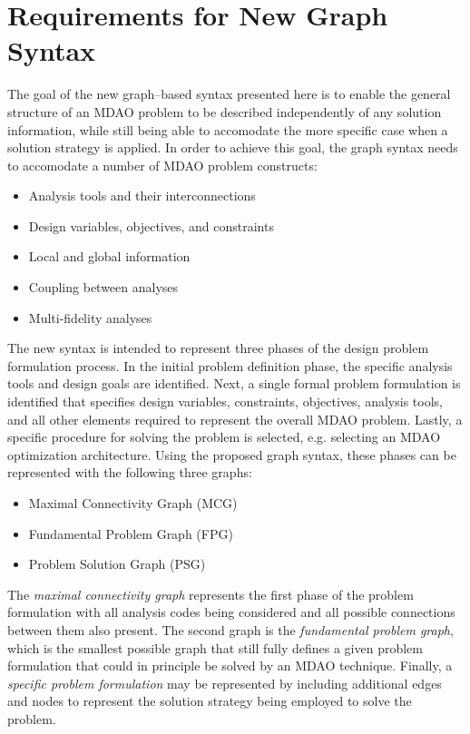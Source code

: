 \newcommand{\st}{ \ | \ }

\section{Requirements for New Graph Syntax}
  \label{s:requirements}
  The goal of the new graph--based syntax presented here is to enable the general structure of an MDAO problem to be described independently of any solution information, 
  while still being able to accomodate the more specific case when a solution 
  strategy is applied. In order to achieve this goal, 
  the graph syntax needs to accomodate a number of MDAO problem constructs: 
  \begin{itemize}
    \item Analysis tools and their interconnections
    \item Design variables, objectives, and constraints
    \item Local and global information
    \item Coupling between analyses
    \item Multi-fidelity analyses
  \end{itemize}

The new syntax is intended to represent three phases of the design problem formulation process. 
In the initial problem definition
  phase, the specific analysis tools and design goals are identified. Next, 
  a single formal problem formulation is identified that specifies design variables, constraints, objectives, 
  analysis tools, and all other elements required to represent the overall MDAO problem. 
Lastly, a specific procedure for solving the problem is selected, e.g. selecting an MDAO optimization architecture. Using the proposed graph syntax, these phases 
  can be represented with the following three graphs:
  \begin{itemize}
    \item Maximal Connectivity Graph (MCG)
    \item Fundamental Problem Graph (FPG)
    \item Problem Solution Graph (PSG)
  \end{itemize}

  The \emph{maximal connectivity graph} represents the first phase of the problem formulation with all 
  analysis codes being considered and all possible connections between them also present. The second graph 
  is the \emph{fundamental problem graph}, which is the smallest possible graph 
  that still fully defines a given problem formulation that could in principle be solved by an MDAO technique. Finally, a \emph{specific problem formulation} 
  may be represented by including additional edges and nodes to represent the 
  solution strategy being employed to solve the problem. 

